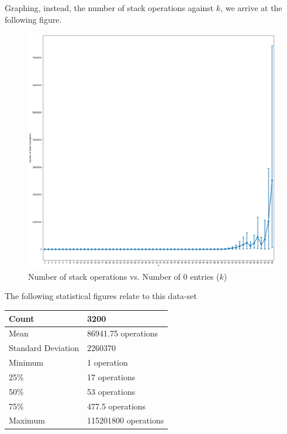 \documentclass[a4paper]{article}
\begin{document}
\newpage
Graphing, instead, the number of stack operations against $k$, we arrive at the following figure.
\begin{figure}[H]
    \centering
    \includegraphics[scale=0.3]{experiment2.png}
    \caption{Number of stack operations vs. Number of 0 entries ($k$)}
    \label{fig:experiment2}
\end{figure}
The following statistical figures relate to this data-set
\begin{table}[H]
    \centering
    \begin{tabular}{|l|l|}
        \hline
        Count                   & 3200                      \\ \hline
        Mean                    &  86941.75 operations      \\ \hline
        Standard Deviation      &  2260370                  \\ \hline
        Minimum                 &  1 operation              \\ \hline
        25\%                    &  17 operations            \\ \hline
        50\%                    &  53 operations            \\ \hline
        75\%                    &  477.5 operations         \\ \hline
        Maximum                 &  115201800 operations     \\ \hline
    \end{tabular}
\end{table}
\newpage
\end{document}
